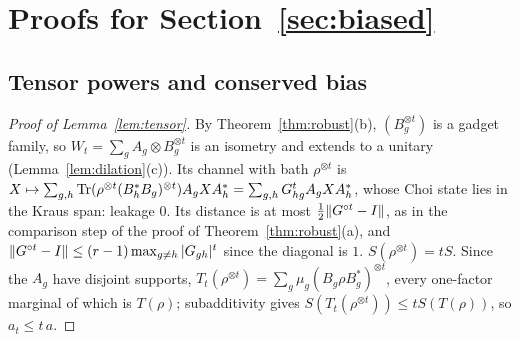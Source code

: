 \section{Proofs for Section~\ref{sec:biased}}\label{app:biased}

\subsection{Tensor powers and conserved bias}

\begin{proof}[Proof of Lemma~\ref{lem:tensor}]
By Theorem~\ref{thm:robust}(b), $(B_g^{\otimes t})$ is a gadget family, so $W_t=\sum_gA_g\otimes B_g^{\otimes t}$ is an isometry and extends to a unitary
(Lemma~\ref{lem:dilation}(c)). Its channel with bath $\rho^{\otimes t}$ is $X\mapsto\sum_{g,h}\operatorname{Tr}(\rho^{\otimes t}(B_h^*B_g)^{\otimes t})A_gXA_h^*=\sum_{g,h}G_{hg}^tA_gXA_h^*$, whose Choi
state lies in the Kraus span: leakage $0$. Its distance is at most $\frac12\lVert G^{\circ t}-I\rVert$, as in the comparison step of the proof of
Theorem~\ref{thm:robust}(a), and $\lVert G^{\circ t}-I\rVert\le(r-1)\max_{g\ne h}|G_{gh}|^t$ since the diagonal is $1$. $S(\rho^{\otimes t})=tS$. Since the $A_g$ have disjoint
supports, $T_t(\rho^{\otimes t})=\sum_g\mu_g(B_g\rho B_g^*)^{\otimes t}$, every one-factor marginal of which is $T(\rho)$; subadditivity gives $S(T_t(\rho^{\otimes t}))\le tS(T(\rho))$, so
$a_t\le t\,a$.
\end{proof}

